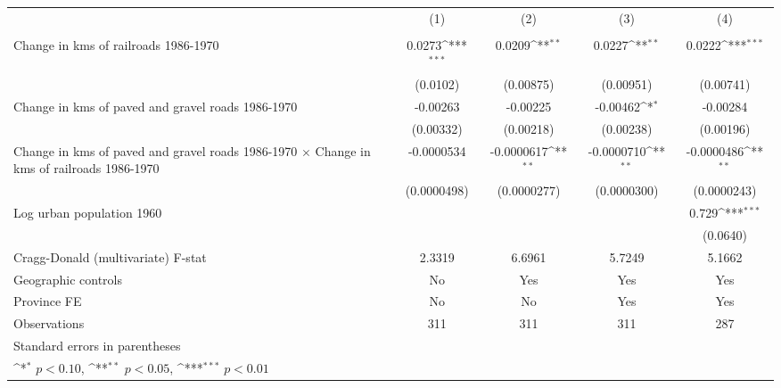 {
\def\sym#1{\ifmmode^{#1}\else\(^{#1}\)\fi}
\begin{tabular}{l*{4}{c}}
\hline\hline
                &\multicolumn{1}{c}{(1)}&\multicolumn{1}{c}{(2)}&\multicolumn{1}{c}{(3)}&\multicolumn{1}{c}{(4)}\\
                &\multicolumn{1}{c}{}&\multicolumn{1}{c}{}&\multicolumn{1}{c}{}&\multicolumn{1}{c}{}\\
\hline
Change in kms of railroads 1986-1970&   0.0273\sym{***}&   0.0209\sym{**} &   0.0227\sym{**} &   0.0222\sym{***}\\
                & (0.0102)         &(0.00875)         &(0.00951)         &(0.00741)         \\
[1em]
Change in kms of paved and gravel roads 1986-1970& -0.00263         & -0.00225         & -0.00462\sym{*}  & -0.00284         \\
                &(0.00332)         &(0.00218)         &(0.00238)         &(0.00196)         \\
[1em]
Change in kms of paved and gravel roads 1986-1970 $\times$ Change in kms of railroads 1986-1970&-0.0000534         &-0.0000617\sym{**} &-0.0000710\sym{**} &-0.0000486\sym{**} \\
                &(0.0000498)         &(0.0000277)         &(0.0000300)         &(0.0000243)         \\
[1em]
Log urban population 1960&                  &                  &                  &    0.729\sym{***}\\
                &                  &                  &                  & (0.0640)         \\
\hline
Cragg-Donald (multivariate) F-stat&   2.3319         &   6.6961         &   5.7249         &   5.1662         \\
Geographic controls&       No         &      Yes         &      Yes         &      Yes         \\
Province FE     &       No         &       No         &      Yes         &      Yes         \\
Observations    &      311         &      311         &      311         &      287         \\
\hline\hline
\multicolumn{5}{l}{\footnotesize Standard errors in parentheses}\\
\multicolumn{5}{l}{\footnotesize \sym{*} \(p<0.10\), \sym{**} \(p<0.05\), \sym{***} \(p<0.01\)}\\
\end{tabular}
}
